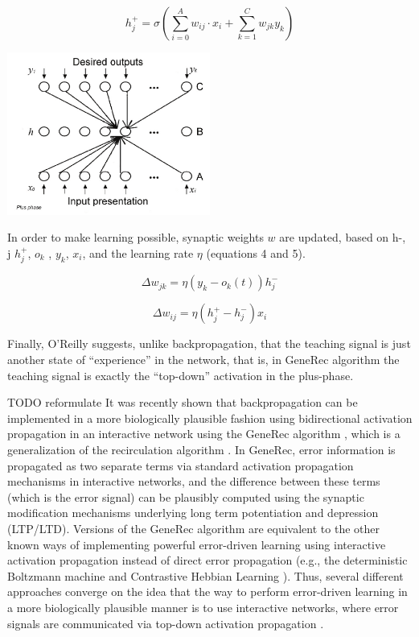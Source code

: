 $$h_j^+ = \sigma\left( \sum_{i=0}^A w_{ij} \cdot x_i + \sum_{k=1}^C w_{jk} y_k \right)$$

\begin{center} 
\includegraphics[width=0.5\textwidth]{img/generec_plus_phase.png} \citet{orru2008sabio} 
\end{center} 

In order to make learning possible, synaptic weights $w$ are updated, based on h-, j  $h^+_j$, $o_k$ , $y_k$, $x_i$, and the learning rate $\eta$ (equations 4 and 5).

$$\Delta w_{jk} = \eta(y_k - o_k(t)) h^-_j $$

$$\Delta w_{ij} = \eta(h^+_j - h^-_j) x_i$$

Finally, O’Reilly \citet{o1998six} suggests, unlike backpropagation, that the teaching signal is just another state of “experience” in the network, that is, in GeneRec algorithm the teaching signal is exactly the “top-down” activation in the plus-phase.

TODO reformulate 
It was recently shown that backpropagation can be implemented in a more biologically plausible fashion using bidirectional activation propagation in an interactive network using the GeneRec algorithm \citet{o1996bio}, which is a generalization of the recirculation algorithm \citet{hinton1988learning}. In GeneRec, error information is propagated as two separate terms via standard activation propagation mechanisms in interactive networks, and the difference between these terms (which is the error signal) can be plausibly computed using the synaptic modification mechanisms underlying long term potentiation and depression (LTP/LTD). Versions of the GeneRec algorithm are equivalent to the other known ways of implementing powerful error-driven learning using interactive activation propagation instead of direct error propagation (e.g., the deterministic Boltzmann machine \citet{hinton1989deterministic} and Contrastive Hebbian Learning \citet{movellan1990contrastive}). Thus, several different approaches converge on the idea that the way to perform error-driven learning in a more biologically plausible manner is to use interactive networks, where error signals are communicated via top-down activation propagation \citet{o2001generalization}.

